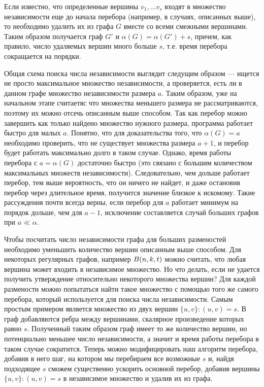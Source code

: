 Если известно, что определенные вершины $v_1, \dots v_s$ входят в множество
независимости еще до начала перебора (например, в случаях, описанных выше),
то необходимо удалить их из графа $G$ вместе со всеми смежными вершинами. Таким
образом получается граф $G'$ и $\alpha(G) = \alpha(G') + s$, причем,
как правило, число удаляемых вершин много больше $s$, т.е. время перебора
сокращается на порядки.

Общая схема поиска числа независимости выглядит следущим образом ---
ищется не просто максимальное
множество независимости, а проверяется, есть ли в данном графе множество
независимости размера $a$. Таким образом, уже на начальном этапе считаетяс
что множества меньшего размера не рассматриваются, поэтому их можно отсечь
описанным выше способом.
Так как перебор можно завершить как только найдено
множество нужного размера, программа работает быстро для малых $a$. Понятно,
что для доказательства того, что $\alpha(G)=a$ необходимо проверить, что
не существует множества размера $a+1$, и перебор будет работать максимально
долго в таком случае. Однако, время работы перебора с $a=\alpha(G)$ достаточно
быстро (это связано с большим количеством максимальных множеств независимости).
Следовательно, чем дольше работает перебор, тем выше вероятность, что
он ничего не найдет, и даже остановив перебор через длительное
время, получится значение близкое к искомому. Такие
рассуждения почти всегда верны, если перебор для $a$ работает минимум на
порядок дольше, чем для $a-1$, исключение составляется случай больших графов
при $a \ll \alpha$.

Чтобы посчитать число независимости графа для больших разменостей необходимо
уменьшить количество вершин описанным выше способом. Для некоторых регулярных
графов, например $B(n,k,t)$ можно считать, что любая вершина может входить в
независимое множество. Но что делать, если не
удается получить утверждение относительно некоторого множества вершин?
Для каждой размености можно попытаться найти такое множество
с помощью того же самого перебора,
который используется для поиска числа независимости. Самым простым примером
является множество из двух вершин $\{u,v\}: (u,v)=s$. В граф добавляются ребра
между вершинами, скалярное произведение которых равно $s$. Полученный таким
образом граф имеет то же количество вершин, но потенциально меньшее число
независимости, а значит и время работы перебора в таком случае сократится.
Теперь можно модифицировать наш алгоритм перебора, добавив в него шаг, на
котором мы перебираем все возможные $s$ и, найдя подходящее $s$ сможем
существенно ускорить основной перебор, добавив вершины $\{u,v\}: (u,v)=s$
в независимое множество и удалив их из графа.

